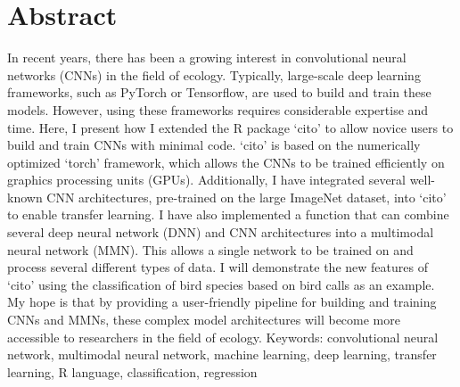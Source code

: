 \documentclass[12pt,twoside]{scrreport}
\newcommand{\pkg}[1]{`#1'}
\begin{document}
\chapter*{Abstract}
\noindent In recent years, there has been a growing interest in convolutional neural networks (CNNs) in the field of ecology. Typically, large-scale deep learning frameworks, such as PyTorch or Tensorflow, are used to build and train these models. However, using these frameworks requires considerable expertise and time. Here, I present how I extended the R package \pkg{cito} to allow novice users to build and train CNNs with minimal code. \pkg{cito} is based on the numerically optimized \pkg{torch} framework, which allows the CNNs to be trained efficiently on graphics processing units (GPUs). Additionally, I have integrated several well-known CNN architectures, pre-trained on the large ImageNet dataset, into \pkg{cito} to enable transfer learning. I have also implemented a function that can combine several deep neural network (DNN) and CNN architectures into a multimodal neural network (MMN). This allows a single network to be trained on and process several different types of data. I will demonstrate the new features of \pkg{cito} using the classification of bird species based on bird calls as an example. My hope is that by providing a user-friendly pipeline for building and training CNNs and MMNs, these complex model architectures will become more accessible to researchers in the field of ecology.
\newline\newline
Keywords: convolutional neural network, multimodal neural network, machine learning, deep learning, transfer learning, R language, classification, regression

\newpage
\thispagestyle{empty}
\vspace*{\fill} %
\mbox{} %

\tableofcontents

\newpage
\thispagestyle{empty}
\vspace*{\fill} %
\mbox{} %
\end{document}
